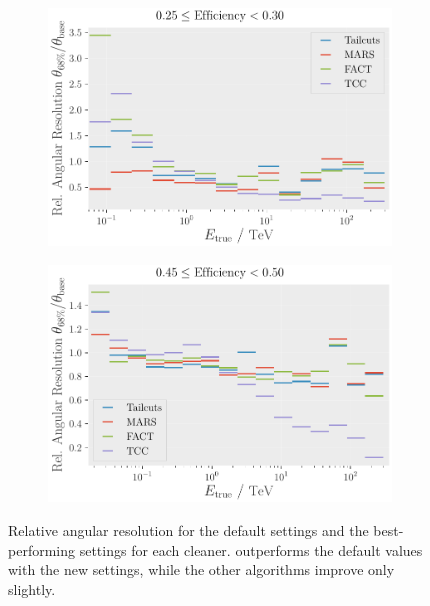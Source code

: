 \begin{figure}
    \centering
    \begin{subfigure}[t]{0.45\textwidth}
        \centering
        \includegraphics[width=\textwidth]{plots/ar_aeff/Rel_AR_0.25_0.30_base.pdf}
    \end{subfigure}
    \hfill
    \begin{subfigure}[t]{0.45\textwidth}
        \centering
        \includegraphics[width=\textwidth]{plots/ar_aeff/Rel_AR_0.45_0.50_base.pdf}
    \end{subfigure}
    \caption{Relative angular resolution for the default settings and the best-performing settings for each cleaner.
    \tcc{} outperforms the default values with the new settings, while the other algorithms improve only slightly.}
    \label{fig:rel_angres}
\end{figure}

